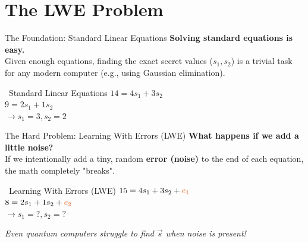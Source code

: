 \documentclass[aspectratio=169, 10pt]{beamer}
\begin{document}
\section{The LWE Problem}

\begin{frame}{The Foundation: Standard Linear Equations}
    \Large
    \textbf{Solving standard equations is easy.} \\
    \vspace{0.4cm}
    \normalsize
    Given enough equations, finding the exact secret values ($s_1, s_2$) is a trivial task for any modern computer (e.g., using Gaussian elimination).
    \vspace{0.4cm}

    \begin{block}{\faCheckCircle \ Standard Linear Equations}
        \centering
        \vspace{0.3cm}
        \Large $14 = 4s_1 + 3s_2$ \\
        \vspace{0.2cm}
        \Large $9 = 2s_1 + 1s_2$ \\
        \vspace{0.4cm}
        \Large \textbf{\textcolor{DeepBlue}{$\rightarrow s_1 = 3, s_2 = 2$}}
        \vspace{0.3cm}
    \end{block}
\end{frame}

\begin{frame}{The Hard Problem: Learning With Errors (LWE)}
    \Large
    \textbf{What happens if we add a little noise?} \\
    \vspace{0.2cm}
    \normalsize
    If we intentionally add a tiny, random \textbf{error (noise)} to the end of each equation, the math completely "breaks".
    \vspace{0.2cm}

    \begin{alertblock}{\faLock \ Learning With Errors (LWE)}
        \centering
        \vspace{0.1cm}
        \Large 
        $15 = 4s_1 + 3s_2 + \textcolor{AccentOrange}{{e_1}}$ \\[0.2cm]
        $8 = 2s_1 + 1s_2 + \textcolor{AccentOrange}{{e_2}}$ \\[0.3cm]
        \textbf{\textcolor{AccentOrange}{$\rightarrow s_1 = \text{?}, s_2 = \text{?}$}}
        \vspace{0.1cm}
    \end{alertblock}
    \vspace{0.3cm}
    \centering
    \small \textit{Even quantum computers struggle to find $\vec{s}$ when noise is present!}
\end{frame}
\end{document}
